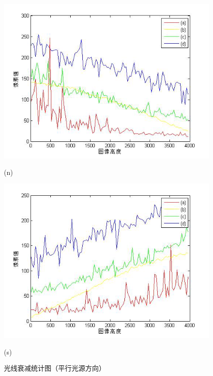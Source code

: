 \begin{figure}[htbp]
\begin{minipage}{0.48\linewidth}
\centerline{\includegraphics[width=1\linewidth]{figures/guangxianshuaijianduibituchuzhin.png}}
\centerline{(n)}
\end{minipage}
\begin{minipage}{0.48\linewidth}
\centerline{\includegraphics[width=1\linewidth]{figures/guangxianshuaijianduibituchuzhis.png}}
\centerline{(s)}
\end{minipage}

\caption{光线衰减统计图（平行光源方向）}
\label{fig:guangxiansunshipingxing}
\vspace{-3mm}
\end{figure}


